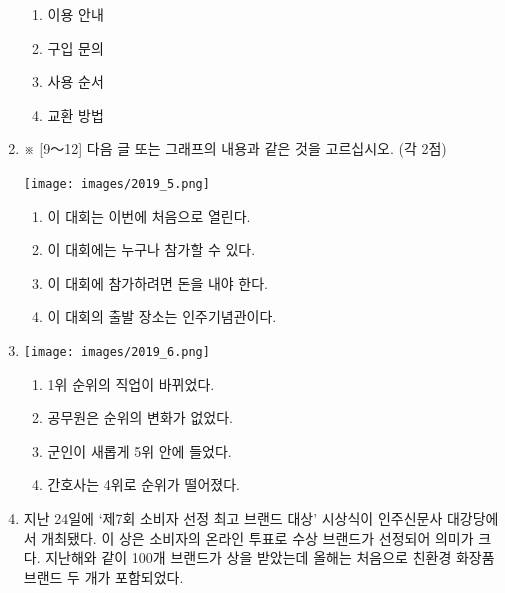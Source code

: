 \documentclass[12pt]{article}
\begin{document}
\begin{enumerate}[1.]
    \begin{enumerate}[1)]
        \item 이용 안내
        \item 구입 문의
        \item 사용 순서
        \item 교환 방법
    \end{enumerate}




    \item ※ [9～12] 다음 글 또는 그래프의 내용과 같은 것을 고르십시오. (각 2점)

    \begin{center}
    \texttt{[image: images/2019\_5.png]}
    \end{center}

    \begin{enumerate}[1)]
        \item 이 대회는 이번에 처음으로 열린다.
        \item 이 대회에는 누구나 참가할 수 있다.
        \item 이 대회에 참가하려면 돈을 내야 한다.
        \item 이 대회의 출발 장소는 인주기념관이다.
    \end{enumerate}

    \item

    \begin{center}
    \texttt{[image: images/2019\_6.png]}
    \end{center}

    \begin{enumerate}[1)]
        \item 1위 순위의 직업이 바뀌었다.
        \item 공무원은 순위의 변화가 없었다.
        \item 군인이 새롭게 5위 안에 들었다.
        \item 간호사는 4위로 순위가 떨어졌다.
    \end{enumerate}


    \item

    \begin{mdframed}

    지난 24일에 ‘제7회 소비자 선정 최고 브랜드 대상’ 시상식이 인주신문사
    대강당에서 개최됐다. 이 상은 소비자의 온라인 투표로 수상 브랜드가
    선정되어 의미가 크다. 지난해와 같이 100개 브랜드가 상을 받았는데 올해는
    처음으로 친환경 화장품 브랜드 두 개가 포함되었다.


\end{mdframed}
\end{enumerate}
\end{document}
